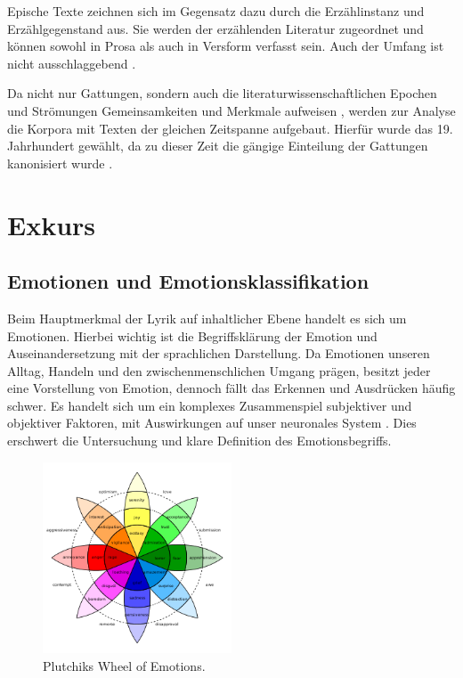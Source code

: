 \documentclass[a4paper,10p]{article}
\begin{document}
Epische Texte zeichnen sich im Gegensatz dazu durch die Erzählinstanz und Erzählgegenstand aus. Sie werden der erzählenden Literatur zugeordnet und können sowohl in Prosa als auch in Versform verfasst sein. Auch der Umfang ist nicht ausschlaggebend \citep[vgl.][S. 195]{SchweikleGunther;Burdorf2007}. \par 

Da nicht nur Gattungen, sondern auch die literaturwissenschaftlichen Epochen und Strömungen Gemeinsamkeiten und Merkmale aufweisen \citep[vgl.][S. 274]{Krah2006}, werden zur Analyse die Korpora mit Texten der gleichen Zeitspanne aufgebaut. Hierfür wurde das 19. Jahrhundert gewählt, da zu dieser Zeit die gängige Einteilung der Gattungen kanonisiert wurde \citep[vgl.][S. 368]{Krah2006}.


\section{Exkurs}
\subsection{Emotionen und Emotionsklassifikation}
Beim Hauptmerkmal der Lyrik auf inhaltlicher Ebene handelt es sich um Emotionen. Hierbei wichtig ist die Begriffsklärung der Emotion und Auseinandersetzung mit der sprachlichen Darstellung. Da Emotionen unseren Alltag, Handeln und den zwischenmenschlichen Umgang prägen, besitzt jeder eine Vorstellung von Emotion, dennoch fällt das Erkennen und Ausdrücken häufig schwer. Es handelt sich um ein komplexes Zusammenspiel subjektiver und objektiver Faktoren, mit Auswirkungen auf unser neuronales System \citep[vgl.][S. 355]{KleinginnaPaulR;Kleinginna1981}. Dies erschwert die Untersuchung und klare Definition des Emotionsbegriffs. \par 

\begin{figure}
	\includegraphics[width=0.5\textwidth]{plutchik_wheel.png}
	\caption{Plutchiks Wheel of Emotions.}
	\label{Wheel}
\end{figure}
\end{document}
